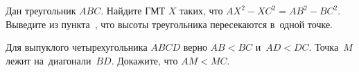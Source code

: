 \begin{problems}
\item
\subproblem{}%
Дан треугольник $ABC$.
Найдите ГМТ $X$ таких, что $AX^2 - XC^2 = AB^2 - BC^2$.
\\
\subproblem
Выведите из пункта~,
что высоты треугольника пересекаются в~одной точке.


\item
Для выпуклого четырехугольника $ABCD$ верно $AB < BC$ и~$AD < DC$.
Точка~$M$ лежит на~диагонали~$BD$.
Докажите, что $AM < MC$.

\end{problems}

